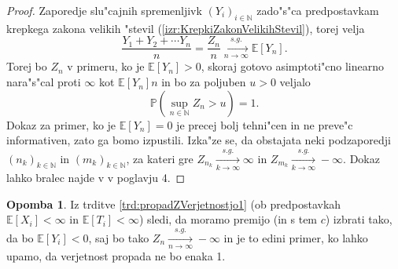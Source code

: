 \documentclass[12pt, a4paper, reqno]{amsart}
\theoremstyle{definition}
\newtheorem{opomba}[definicija]{Opomba}
\theoremstyle{plain}
\newcommand{\N}{\mathbb{N}}
\newcommand{\E}{\mathbb{E}}
\newcommand{\Prob}{\mathbb{P}}
\newcommand{\1}{\mathds{1}}
\begin{document}
        \begin{proof}
            Zaporedje slu"cajnih spremenljivk $(Y_i)_{i\in\N}$ zado"s"ca predpostavkam krepkega zakona
            velikih "stevil (\ref{izr:KrepkiZakonVelikihStevil}), torej velja
            \begin{equation*}
                \frac{Y_1 + Y_2 + \cdots Y_n}{n} = \frac{Z_n}{n} \xrightarrow[n\to\infty]{s.g.} \E\left[Y_n\right].
            \end{equation*}
            Torej bo $Z_n$ v primeru, ko je $\E\left[Y_n\right]>0$, 
             skoraj gotovo asimptoti"cno linearno nara"s"cal proti $\infty$ kot $\E\left[Y_n\right] n$ in 
             bo za poljuben $u>0$ veljalo 
            \begin{equation*}
                \Prob\left(\sup_{n\in\N}Z_n > u\right) = 1.
            \end{equation*}
            Dokaz za primer, ko je $\E\left[Y_n\right] = 0$ je precej bolj tehni"cen in ne preve"c informativen, zato 
            ga bomo izpustili. Izka"ze se, da obstajata neki podzaporedji $(n_k)_{k\in\N}$ in $(m_k)_{k\in\N}$, 
            za kateri gre
            $Z_{n_k} \xrightarrow[k\to\infty]{s.g.}\infty$ in 
            $Z_{m_k} \xrightarrow[k\to\infty]{s.g.}-\infty$.
            Dokaz lahko bralec najde v \cite{6} v poglavju 4.
        \end{proof}

        \begin{opomba}
            Iz trditve \ref{trd:propadZVerjetnostjo1} (ob predpostavkah $\E\left[X_i\right] < \infty$
            in $\E\left[T_i\right] < \infty$) sledi, da moramo premijo (in s tem $c$) izbrati tako, da bo 
            $\E\left[Y_i\right] < 0$, saj bo tako $Z_{n} \xrightarrow[n\to\infty]{s.g.}-\infty$
            in je to edini primer, ko lahko upamo, da verjetnost propada ne bo
            enaka 1.
            \label{op:izbiraPremije}
        \end{opomba}
    
\end{document}
